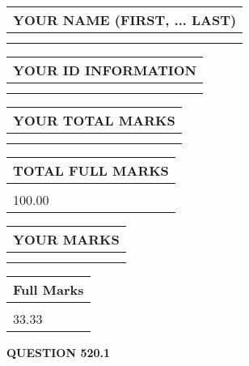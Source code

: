 \documentclass{ctexart}
\begin{document}
   
   
   
\newpage 
\setcounter{page}{ 
   520001 } 
   
   
   
   
\noindent\begin{tabular}{|l|}
\hline
YOUR NAME (FIRST, ... LAST)  \\
\hline
 \\ 
 \\ 
\hline
\end{tabular}
\hspace{0.05in} \begin{tabular}{|l|}
\hline
 YOUR   ID   INFORMATION  \\
\hline
 \\ 
 \\ 
\hline
\end{tabular}
   
   
\vspace{0.2in}\noindent\begin{tabular}{|l|}
\hline
YOUR TOTAL MARKS  \\
\hline
 \\ 
 \\ 
\hline
\end{tabular}
\hspace{0.05in} \begin{tabular}{|l|}
\hline
TOTAL FULL MARKS  \\
\hline
 \\ 
100.00 \\
\hline
\end{tabular}
   
   
 \vspace{0.2in}
 
 
 
 
   
   
  
\vspace{0.2in}
  
\noindent\begin{tabular}{|l|}
\hline
 YOUR MARKS  \\
\hline
 \\ 
 \\ 
\hline
\end{tabular}
\hspace{0.05in} \begin{tabular}{|l|}
\hline
 Full Marks  \\
\hline
 \\ 
33.33 \\
\hline
\end{tabular}
{\textbf{\Large{QUESTION
520.1 
}}}
  
\end{document}
